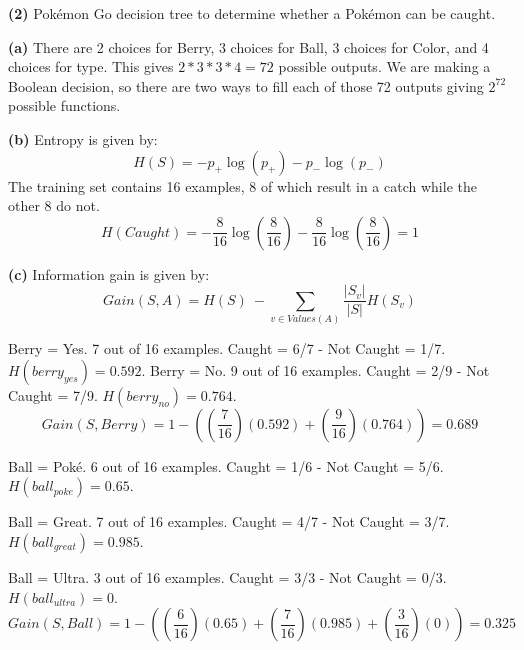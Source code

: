 \documentclass[11pt]{article}
\renewcommand\part[1]{\vspace{.10in}\textbf{(#1)}}
\begin{document}
\part{2} Pok\'{e}mon Go decision tree to determine whether a Pok\'{e}mon can be caught.

\part{a} There are 2 choices for Berry, 3 choices for Ball, 3 choices for Color, and 4 choices for type. This gives $2 * 3 * 3 * 4 = 72$ possible outputs. We are making a Boolean decision, so there are two ways to fill each of those 72 outputs giving $2^{72}$ possible functions.

 \par

\part{b} Entropy is given by: $$H(S) = -p_+\log(p_+) - p_-\log(p_-)$$
The training set contains 16 examples, 8 of which result in a catch while the other 8 do not. 
$$H(Caught) = -\frac{8}{16}\log(\frac{8}{16})-\frac{8}{16}\log(\frac{8}{16}) = 1$$

 \par
	
\part{c} Information gain is given by:
$$Gain(S, A) = H(S)\  - \sum_{v\in Values(A)} \frac{|S_v|}{|S|} H(S_v)$$

Berry = Yes. 7 out of 16 examples. Caught = 6/7 - Not Caught = 1/7. $H(berry_{yes}) = 0.592$.
Berry = No. 9 out of 16 examples. Caught = 2/9 - Not Caught = 7/9. $H(berry_{no}) = 0.764$.
$$Gain(S, Berry) = 1 - ((\frac{7}{16})(0.592) + (\frac{9}{16})(0.764)) = 0.689$$

 \par
\newpage

Ball = Pok\'{e}. 6 out of 16 examples. Caught = 1/6 - Not Caught = 5/6. $H(ball_{poke}) = 0.65$.

Ball = Great. 7 out of 16 examples. Caught = 4/7 - Not Caught = 3/7. $H(ball_{great}) = 0.985$.

Ball = Ultra. 3 out of 16 examples. Caught = 3/3 - Not Caught = 0/3. $H(ball_{ultra}) = 0$.
$$Gain(S, Ball) = 1 - ((\frac{6}{16})(0.65) + (\frac{7}{16})(0.985) + (\frac{3}{16})(0)) = 0.325$$
\end{document}
